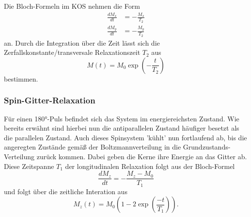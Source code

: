 Die Bloch-Formeln im KOS nehmen die Form
\begin{align}
    \frac{dM_x}{dt}&=-\frac{M_x}{T_2}\\
    \frac{dM_y}{dt}&=-\frac{M_y}{T_2}
\end{align}
an. Durch die Integration über die Zeit lässt sich die Zerfallskonstante/transversale Relaxationszeit $T_2$ aus
\begin{equation}
    M(t)=M_0\exp\left(-\frac{t}{T_2}\right)
\end{equation}
bestimmen.
\subsubsection{Spin-Gitter-Relaxation}
Für einen 180°-Puls befindet sich das System im energiereichsten Zustand. Wie bereits erwähnt sind hierbei nun die antiparallelen Zustand
häufiger besetzt als die parallelen Zustand. Auch dieses Spinsystem 'kühlt' nun fortlaufend ab, bis die angeregten Zustände gemäß der Boltzmannverteilung
in die Grundzustands-Verteilung zurück kommen. Dabei geben die Kerne ihre Energie an das Gitter ab. 
Diese Zeitspanne $T_1$ der longitudinalen Relaxation folgt aus der Bloch-Formel
\begin{equation}
    \frac{dM_z}{dt}=-\frac{M_z-M_0}{T_1}
\end{equation} 
und folgt über die zeitliche Interation aus
\begin{equation}
    M_z(t)=M_0\left(1-2\exp\left(\frac{-t}{T_1}\right)\right).
\end{equation}
